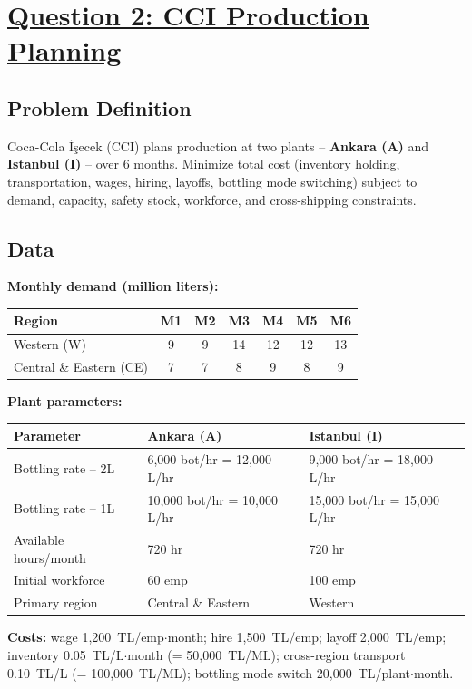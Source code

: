 \documentclass[12pt,a4paper]{article}
\begin{document}
\newpage

\section*{\underline{Question 2: CCI Production Planning}}

\subsection*{Problem Definition}

Coca-Cola \.{I}\c{s}ecek (CCI) plans production at two plants -- \textbf{Ankara (A)} and
\textbf{Istanbul (I)} -- over 6 months. Minimize total cost (inventory holding, transportation,
wages, hiring, layoffs, bottling mode switching) subject to demand, capacity, safety stock,
workforce, and cross-shipping constraints.

\subsection*{Data}

\textbf{Monthly demand (million liters):}

\begin{tabular}{lcccccc}
\toprule
Region & M1 & M2 & M3 & M4 & M5 & M6 \\
\midrule
Western (W)          & 9 & 9 & 14 & 12 & 12 & 13 \\
Central \& Eastern (CE) & 7 & 7 &  8 &  9 &  8 &  9 \\
\bottomrule
\end{tabular}

\medskip
\textbf{Plant parameters:}

\begin{tabular}{lll}
\toprule
Parameter & Ankara (A) & Istanbul (I) \\
\midrule
Bottling rate -- 2L & 6,000 bot/hr = 12,000 L/hr & 9,000 bot/hr = 18,000 L/hr \\
Bottling rate -- 1L & 10,000 bot/hr = 10,000 L/hr & 15,000 bot/hr = 15,000 L/hr \\
Available hours/month & 720 hr & 720 hr \\
Initial workforce & 60 emp & 100 emp \\
Primary region & Central \& Eastern & Western \\
\bottomrule
\end{tabular}

\medskip
\textbf{Costs:} wage 1,200~TL/emp$\cdot$month; hire 1,500~TL/emp; layoff 2,000~TL/emp;
inventory 0.05~TL/L$\cdot$month (= 50,000~TL/ML); cross-region transport 0.10~TL/L
(= 100,000~TL/ML); bottling mode switch 20,000~TL/plant$\cdot$month.
\end{document}

